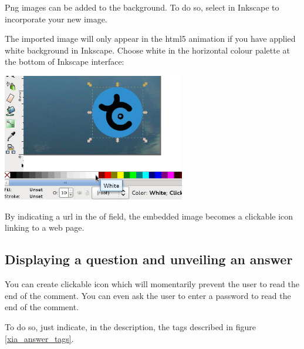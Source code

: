 Png images can be added to the background. To do so, select  in 
Inkscape to incorporate your new image.

The imported image will only appear in the html5 animation if you have applied white background in 
Inkscape. Choose white in the horizontal colour palette at the bottom of 
Inkscape interface:\\

\begin{center}
\includegraphics[width=0.6\textwidth]{images/white_fill}\\ 
\end{center}


By indicating a url in the  of  field, 
the embedded image becomes a clickable icon linking to a web page.

\subsection{Displaying a question and unveiling an answer}

You can create clickable icon which will momentarily 
prevent the user to read the end of the comment.
You can even ask the user to enter a password to read the 
end of the comment.

To do so, just indicate, in the description, the tags described in figure \ref{xia_answer_tags}.

